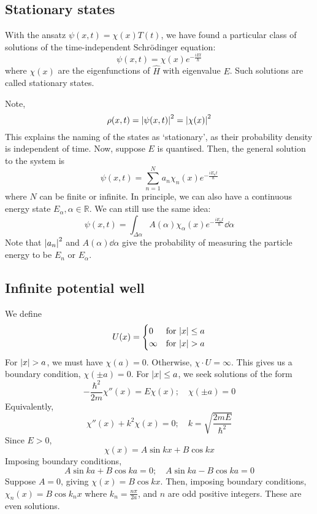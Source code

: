 \subsection{Stationary states}
\begin{definition}
	With the ansatz \( \psi(x,t) = \chi(x) T(t) \), we have found a particular class of solutions of the time-independent Schr\"odinger equation:
	\[
		\psi(x,t) = \chi(x) e^{-\frac{i E t}{\hbar}}
	\]
	where \( \chi(x) \) are the eigenfunctions of \( \hat H \) with eigenvalue \( E \).
	Such solutions are called stationary states.
\end{definition}
Note,
\[
	\rho(x,t) = \abs{\psi(x,t)}^2 = \abs{\chi(x)}^2
\]
This explains the naming of the states as `stationary', as their probability density is independent of time.
Now, suppose \( E \) is quantised.
Then, the general solution to the system is
\[
	\psi(x,t) = \sum_{n=1}^N a_n \chi_n(x) e^{-\frac{iE_n t}{\hbar}}
\]
where \( N \) can be finite or infinite.
In principle, we can also have a continuous energy state \( E_\alpha, \alpha \in \mathbb R \).
We can still use the same idea:
\[
	\psi(x,t) = \int_{\Delta \alpha} A(\alpha) \chi_\alpha(x) e^{-\frac{iE_\alpha t}{\hbar}} \dd{\alpha}
\]
Note that \( \abs{a_n}^2 \) and \( A(\alpha) \dd{\alpha} \) give the probability of measuring the particle energy to be \( E_n \) or \( E_\alpha \).

\subsection{Infinite potential well}
We define
\[
	U(x) = \begin{cases}
		0      & \text{for } \abs{x} \leq a \\
		\infty & \text{for } \abs{x} > a
	\end{cases}
\]
For \( \abs{x} > a \), we must have \( \chi(a) = 0 \).
Otherwise, \( \chi \cdot U = \infty \).
This gives us a boundary condition, \( \chi(\pm a) = 0 \).
For \( \abs{x} \leq a \), we seek solutions of the form
\[
	-\frac{\hbar^2}{2m} \chi''(x) = E \chi(x);\quad \chi(\pm a) = 0
\]
Equivalently,
\[
	\chi''(x) + k^2 \chi(x) = 0;\quad k = \sqrt{\frac{2mE}{\hbar^2}}
\]
Since \( E > 0 \),
\[
	\chi(x) = A \sin kx + B \cos kx
\]
Imposing boundary conditions,
\[
	A \sin ka + B \cos ka = 0;\quad A \sin ka - B \cos ka = 0
\]
Suppose \( A = 0 \), giving \( \chi(x) = B \cos kx \).
Then, imposing boundary conditions, \( \chi_n(x) = B \cos k_n x \) where \( k_n = \frac{n \pi}{2a} \), and \( n \) are odd positive integers.
These are even solutions.

